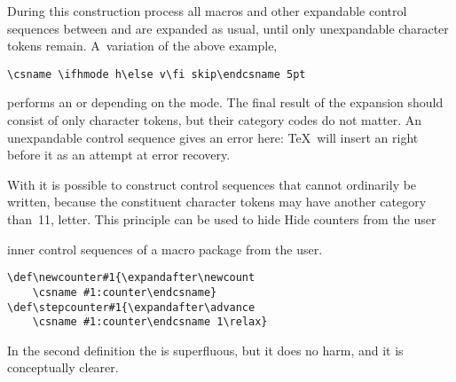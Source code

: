 \documentclass[letterpaper]{book}
\begin{document}
During this construction process
all macros and other expandable control sequences
between  and 
are expanded as usual, until only unexpandable
character tokens remain. A~variation of the above example,
\begin{verbatim}
\csname \ifhmode h\else v\fi skip\endcsname 5pt
\end{verbatim}
performs an  or  depending on the mode.
The final result of the expansion should 
consist of only character tokens, but
their category codes do not matter.
An unexpandable control sequence gives an error here:
\TeX\ will insert an  right before it
as an attempt at error recovery.

With  it is possible to construct
control sequences that cannot ordinarily be written,
because the constituent character tokens may have another category
\alt
than~11, letter. This principle can be used to hide
\howto Hide counters from the user\par
inner control sequences of a macro package from the user.
\begin{example}
\begin{verbatim}
\def\newcounter#1{\expandafter\newcount
    \csname #1:counter\endcsname}
\def\stepcounter#1{\expandafter\advance
    \csname #1:counter\endcsname 1\relax}
\end{verbatim}
In the second definition the  is superfluous,
but it does no harm, and it is conceptually clearer.
\end{example}
\end{document}
